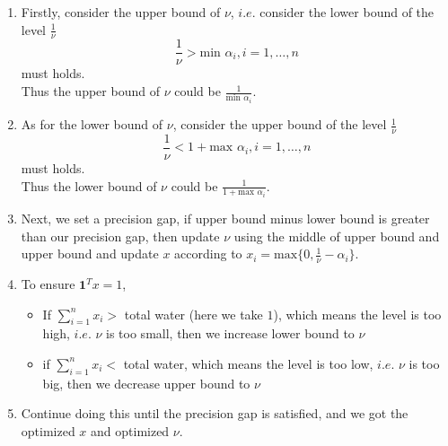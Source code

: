 \documentclass[12pt, a4paper, oneside]{article}
\begin{document}
\begin{enumerate}
    \item 
    {
        Firstly, consider the upper bound of $\nu$, $i.e.$ consider the lower bound of the level $\frac{1}{\nu}$
        \begin{displaymath}
            \frac{1}{\nu} > \mbox{min } \alpha_i , i = 1, \dots, n
        \end{displaymath}
        must holds.\\
        Thus the upper bound of $\nu$ could be $\frac{1}{\mbox{min }\alpha_i}$.
    }
    \item
    {
        As for the lower bound of $\nu$, consider the upper bound of the level $\frac{1}{\nu}$
        \begin{displaymath}
            \frac{1}{\nu} < 1 + \mbox{max } \alpha_i , i = 1, \dots, n
        \end{displaymath}
        must holds.\\
        Thus the lower bound of $\nu$ could be $\frac{1}{1 + \mbox{max } \alpha_i}$.
    }
    \item 
    {
        Next, we set a precision gap, if upper bound minus lower bound is greater than our precision gap, 
        then update $\nu$ using the middle of upper bound and upper bound and update $x$ according to $x_i = \mbox{max}\{0, \frac{1}{\nu} - \alpha_i\}$.
    }
    \item
    {
        To ensure $\mathbf{1}^Tx = 1$,
        \begin{itemize}
            \item If $\sum_{i=1}^{n}x_i >$ total water (here we take $1$), which means the level is too high, $i.e.$ $\nu$ is too small, then we increase lower bound to $\nu$
            \item if $\sum_{i=1}^{n}x_i <$ total water, which means the level is too low, $i.e.$ $\nu$ is too big, then we decrease upper bound to $\nu$
        \end{itemize}
    }
    \item
    {
        Continue doing this until the precision gap is satisfied, and we got the optimized $x$ and optimized $\nu$.
    }
\end{enumerate}
\end{document}
